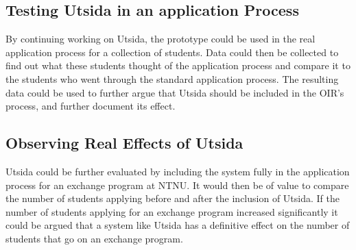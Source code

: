 \subsection{Testing Utsida in an application Process}

By continuing working on Utsida, the prototype could be used in the real application process for a collection of students. Data could then be collected to find out what these students thought of the application process and compare it to the students who went through the standard application process. The resulting data could be used to further argue that Utsida should be included in the OIR's process, and further document its effect.

\subsection{Observing Real Effects of Utsida}

Utsida could be further evaluated by including the system fully in the application process for an exchange program at NTNU. It would then be of value to compare the number of students applying before and after the inclusion of Utsida. If the number of students applying for an exchange program increased significantly it could be argued that a system like Utsida has a definitive effect on the number of students that go on an exchange program. 



\cleardoublepage